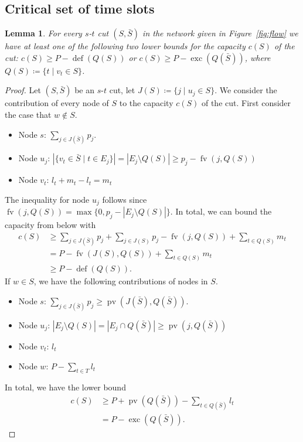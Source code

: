 \documentclass[a4paper]{article}
\DeclareMathOperator{\fv}{fv}
\DeclareMathOperator{\pv}{pv}
\DeclareMathOperator{\opdef}{def}
\DeclareMathOperator{\exc}{exc}
\newtheorem{lemma}[theorem]{Lemma}
\begin{document}
\subsection{Critical set of time slots}
\begin{lemma}\label{lemma:cut}
  For every $s$-$t$ cut $(S, \bar S)$ in the network given in Figure~\ref{fig:flow} we have at least one of the following two lower bounds for the capacity $c(S)$ of the cut:
  $c(S) \geq P - \opdef(Q(S))$ or $c(S) \geq P - \exc(Q(\bar S))$, where $Q(S) \coloneqq \{ t \mid v_t \in S \}$.
\end{lemma}
\begin{proof}
  Let $(S, \bar S)$ be an $s$-$t$ cut, let $J(S) \coloneqq \{j \mid u_j \in S\}$.
  We consider the contribution of every node of $S$ to the capacity $c(S)$ of the cut.
  First consider the case that $w \notin S$.
  \begin{itemize}
    \item Node $s$: $\sum_{j \in J(\bar S)} p_j$.
    \item Node $u_j$: $|\{v_t \in \bar S \mid t \in E_j\}| = | E_j \setminus Q(S) | \geq p_j - \fv(j, Q(S))$
    \item Node $v_t$: $l_t + m_t - l_t = m_t$
  \end{itemize}
  The inequality for node $u_j$ follows since $\fv(j, Q(S)) = \max \{0, p_j - |E_j \setminus Q(S)| \}$.
  In total, we can bound the capacity from below with
  \begin{align}
    c(S) &\geq \sum_{j \in J(\bar S)} p_j + \sum_{j \in J(S)} p_j - \fv(j, Q(S)) + \sum_{t \in Q(S)} m_t
    \\ &= P - \fv(J(S), Q(S)) + \sum_{t \in Q(S)} m_t
    \\ &\geq P - \opdef(Q(S))\text{.}
  \end{align}
  If $w \in S$, we have the following contributions of nodes in $S$.
  \begin{itemize}
    \item Node $s$: $\sum_{j \in J(\bar S)} p_j \geq \pv(J(\bar S), Q(\bar S))$.
    \item Node $u_j$: $| E_j \setminus Q(S) |
      = | E_j \cap Q(\bar S)| \geq \pv(j, Q(\bar S))$
    \item Node $v_t$: $l_t$
    \item Node $w$: $P - \sum_{t \in T} l_t$
  \end{itemize}
  In total, we have the lower bound
  \begin{align}
    c(S) &\geq P + \pv(Q(\bar S))
    - \sum_{t \in Q(\bar S)} l_t
    \\ &= P - \exc(Q(\bar S)) \text{.}
  \end{align}

\end{proof}
\end{document}
